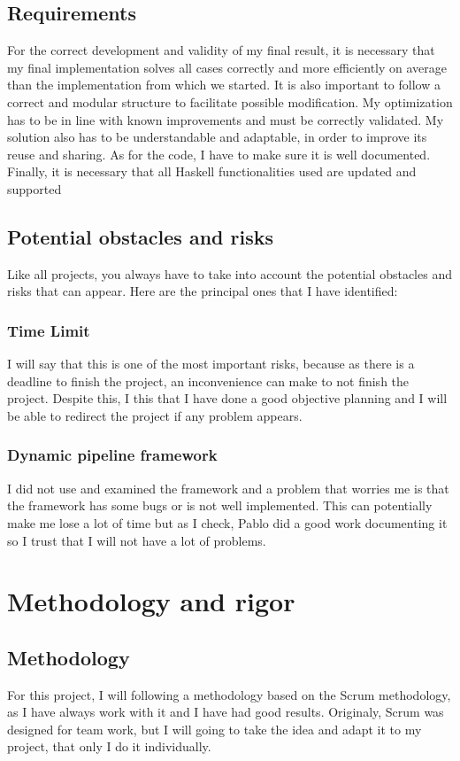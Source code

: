 \section{Requirements}
For the correct development and validity of my final result, it is necessary that my final implementation solves all cases correctly and more efficiently on average than the implementation from which we started.
It is also important to follow a correct and modular structure to facilitate possible modification.
My optimization has to be in line with known improvements and must be correctly validated.
My solution also has to be understandable and adaptable, in order to improve its reuse and sharing.
As for the code, I have to make sure it is well documented.
Finally, it is necessary that all Haskell functionalities used are updated and supported
\section{Potential obstacles and risks}
Like all projects, you always have to take into account the potential obstacles and risks that can appear.
Here are the principal ones that I have identified:
\subsection{Time Limit}
I will say that this is one of the most important risks, because as there is a deadline to finish the project, an inconvenience can make to not finish the project.
Despite this, I this that I have done a good objective planning and I will be able to redirect the project if any problem appears.
\subsection{Dynamic pipeline framework}
I did not use and examined the framework and a problem that worries me is that the framework has some bugs or is not well implemented.
This can potentially make me lose a lot of time but as I check, Pablo did a good work documenting it so I trust that I will not have a lot of problems.

\chapter{Methodology and rigor}
\section{Methodology}
For this project, I will following a methodology based on the Scrum methodology, as I have always work with it and I have had good results.
Originaly, Scrum \cite{noauthor_what_nodate} was designed for team work, but I will going to take the idea and adapt it to my project, that only I do it individually. \\

